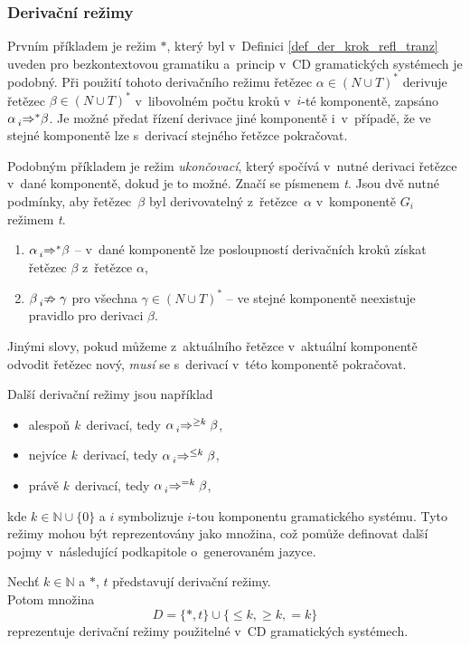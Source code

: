 \subsubsection*{Derivační režimy}

Prvním příkladem je režim $*$, který byl v~Definici \ref{def_der_krok_refl_tranz} uveden pro bezkontextovou gramatiku a~princip v~CD gramatických systémech je podobný.
Při použití tohoto derivačního režimu řetězec $\alpha \in (N \cup T)^*$ derivuje řetězec $\beta \in (N \cup T)^*$ v~libovolném počtu kroků v~$i$-té komponentě, zapsáno $\alpha \prescript{}{i}{\Rightarrow}^{*} \beta$.
Je možné předat řízení derivace jiné komponentě i~v~případě, že ve stejné komponentě lze s~derivací stejného řetězce pokračovat.

Podobným příkladem je režim \emph{ukončovací}, který spočívá v~nutné derivaci řetězce v~dané komponentě, dokud je to možné. Značí se písmenem \emph{t}. Jsou dvě nutné podmínky, aby řetězec~$\beta$ byl derivovatelný z~řetězce~$\alpha$ v~komponentě $G_i$ režimem \emph{t}.
\begin{enumerate}
    \item $\alpha \prescript{}{i}{\Rightarrow}^{*} \beta$ -- v~dané komponentě lze posloupností derivačních kroků získat řetězec $\beta$ z~řetězce $\alpha$,
    \item $\beta \prescript{}{i}{\nRightarrow}\; \gamma$ pro všechna $\gamma \in (N \cup T)^{*}$ -- ve stejné komponentě neexistuje pravidlo pro derivaci $\beta$.
\end{enumerate}
Jinými slovy, pokud můžeme z~aktuálního řetězce v~aktuální komponentě odvodit řetězec nový, \emph{musí} se s~derivací v~této komponentě pokračovat. 

Další derivační režimy jsou například
\begin{itemize}
    \item alespoň \emph{k}~derivací, tedy $\alpha \prescript{}{i}{\Rightarrow}^{\geq k}\; \beta$,
    \item nejvíce \emph{k}~derivací, tedy $\alpha \prescript{}{i}{\Rightarrow}^{\leq k}\; \beta$,
    \item právě \emph{k}~derivací, tedy $\alpha \prescript{}{i}{\Rightarrow}^{=k}\; \beta$,
\end{itemize}
kde $k \in \mathbb{N} \cup \{0\}$ a $i$ symbolizuje $i$-tou komponentu gramatického systému.
Tyto režimy mohou být reprezentovány jako množina, což pomůže definovat další pojmy v~následující podkapitole o~generovaném jazyce.
\begin{definition}\label{def_der_rezimy}
    Nechť $k\in \mathbb{N}$ a $*$, $t$ představují derivační režimy. \\
    Potom množina
    \begin{equation*}
        D = \{*, t\} \cup \{\leq k, \geq k, =k\}
    \end{equation*}        
    reprezentuje derivační režimy použitelné v~CD gramatických systémech.
\end{definition}

